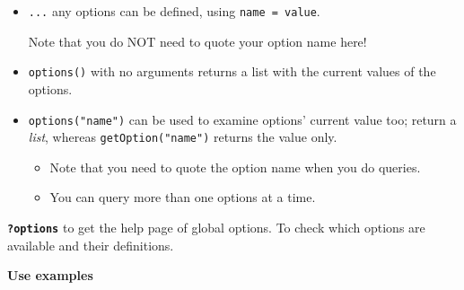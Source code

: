 \documentclass[
]{book}
\newenvironment{Shaded}{\begin{snugshade}}{\end{snugshade}}
\newcommand{\DecValTok}[1]{\textcolor[rgb]{0.00,0.00,0.81}{#1}}
\newcommand{\FunctionTok}[1]{\textcolor[rgb]{0.13,0.29,0.53}{\textbf{#1}}}
\newcommand{\NormalTok}[1]{#1}
\newcommand{\SpecialCharTok}[1]{\textcolor[rgb]{0.81,0.36,0.00}{\textbf{#1}}}
\newcommand{\StringTok}[1]{\textcolor[rgb]{0.31,0.60,0.02}{#1}}
\theoremstyle{definition}
\theoremstyle{definition}
\theoremstyle{definition}
\theoremstyle{definition}
\theoremstyle{remark}
\begin{document}
\begin{itemize}
\item
  \texttt{...} any options can be defined, using \texttt{name\ =\ value}.

  Note that you do {NOT need to quote your option name} here!
\item
  \texttt{options()} with no arguments returns a list with the current values of the options.
\item
  \texttt{options("name")} can be used to examine options' current value too; return a \emph{list}, whereas \texttt{getOption("name")} returns the value only.

  \begin{itemize}
  \item
    Note that you need to quote the option name when you do queries.
  \item
    You can query more than one options at a time.

\begin{Shaded}
\end{Shaded}
  \end{itemize}
\end{itemize}

\textbf{\texttt{?options}} to get the help page of global options. To check which options are available and their definitions.

\textbf{Use examples}
\end{document}
